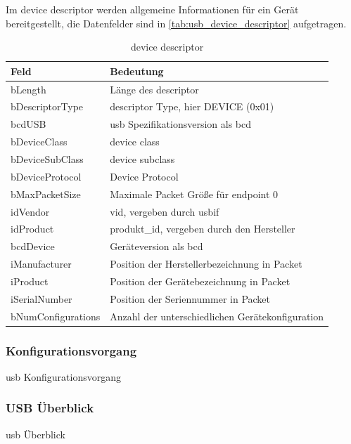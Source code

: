 Im  device descriptor werden allgemeine Informationen für ein Gerät bereitgestellt, die
Datenfelder sind in \autoref{tab:usb_device_descriptor} aufgetragen. %
\begin{table}[h]
    \centering
    \begin{tabular}{|l|l|}
        \hline
        \textbf{Feld}      & \textbf{Bedeutung}                                      \\
        \hline
        bLength            & Länge des descriptor                                    \\
        \hline
        bDescriptorType    & descriptor Type, hier DEVICE (0x01)                     \\
        \hline
        bcdUSB             & \acrshort{usb} Spezifikationsversion als \acrshort{bcd} \\
        \hline
        bDeviceClass       & device class                                            \\
        \hline
        bDeviceSubClass    & device subclass                                         \\
        \hline
        bDeviceProtocol    & Device Protocol                                         \\
        \hline
        bMaxPacketSize     & Maximale Packet Größe für endpoint 0                    \\
        \hline
        idVendor           & \acrfull{vid}, vergeben durch \acrshort{usbif}          \\ %
        \hline
        idProduct          & \acrfull{produkt_id}, vergeben durch den Hersteller     \\
        \hline
        bcdDevice          & Geräteversion als \acrshort{bcd}                        \\
        \hline
        iManufacturer      & Position der Herstellerbezeichnung in Packet            \\
        \hline
        iProduct           & Position der Gerätebezeichnung in Packet                \\
        \hline
        iSerialNumber      & Position der Seriennummer in Packet                     \\
        \hline
        bNumConfigurations & Anzahl der unterschiedlichen Gerätekonfiguration        \\
        \hline
    \end{tabular}
    \caption{device descriptor}
    \label{tab:usb_device_descriptor} %
\end{table}

\subsubsection{Konfigurationsvorgang} \label{sssec:Konfigurationsvorgang}

\acrshort{usb} Konfigurationsvorgang

\subsubsection{USB Überblick} \label{sssec:usb_ueberblick}

\acrshort{usb} Überblick
